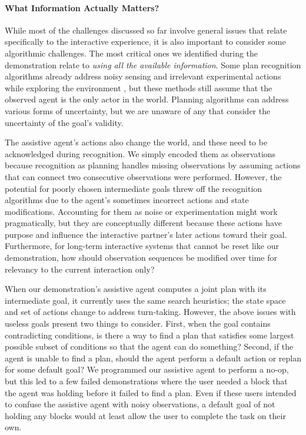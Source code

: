 \documentclass[letterpaper]{article} %
\begin{document}
\paragraph{What Information Actually Matters?} While most of the challenges discussed so far involve general issues that relate specifically to the interactive experience, it is also important to consider some algorithmic challenges. %
 The most critical ones we identified during the demonstration relate to \textit{using all the available information}.  Some plan recognition algorithms already address noisy sensing \cite{DBLP:conf/ijcai/SohrabiRU16} and irrelevant experimental actions while exploring the environment \cite{DBLP:journals/tist/MirskyGS17}, but these methods still assume that the observed agent is the only actor in the world.  Planning algorithms can address various forms of uncertainty, but we are unaware of any that consider the uncertainty of the goal's validity.

The assistive agent's actions also change the world, and these need to be acknowledged during recognition.  We simply encoded them as observations because recognition as planning handles missing observations by assuming actions %
 that can connect two consecutive observations %
 were performed.  However, the potential for poorly chosen intermediate goals %
 threw off the recognition algorithms due to the agent's sometimes incorrect actions and state modifications.  Accounting for them as noise or experimentation might work pragmatically, but they are conceptually different because these actions have purpose and influence the interactive partner's later actions toward their goal.  Furthermore, for long-term interactive systems that cannot be reset like our demonstration, how should observation sequences be modified over time for relevancy to the current interaction only?

When our demonstration's assistive agent computes a joint plan with its intermediate goal, it currently uses the same search heuristics; the state space and set of actions change to address turn-taking.  However, the above issues with useless goals present two things to consider.  First, when the goal contains contradicting conditions, is there a way to find a plan that satisfies some largest possible subset of conditions so that the agent can do something?  Second, if the agent is unable to find a plan, should the agent perform a default action or replan for some default goal?  We programmed our assistive agent to perform a no-op, but this led to a few failed demonstrations where the user needed a block that the agent was holding before it failed to find a plan.  Even if these users intended to confuse the assistive agent with noisy observations, a default goal of %
 not holding any blocks would at least allow the user to complete the task on their own. %
\end{document}
